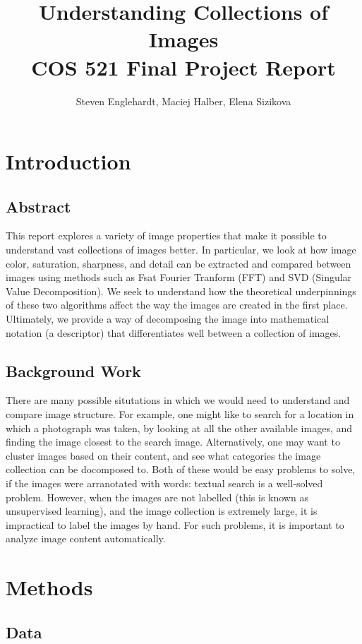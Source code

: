 \documentclass{report}
\author{Steven Englehardt, Maciej Halber, Elena Sizikova}
\title{Understanding Collections of Images \\ \small{COS 521 Final Project Report}}
\begin{document}
\maketitle
\tableofcontents

\chapter{Introduction}
\section{Abstract}
This report explores a variety of image properties that make it possible to understand vast collections of images better. In particular, we look at how image color, saturation, sharpness, and detail can be extracted and compared between images using methods such as Fsat Fourier Tranform (FFT) and SVD (Singular Value Decomposition). We seek to understand how the theoretical underpinnings of these two algorithms affect the way the images are created in the first place. Ultimately, we provide a way of decomposing the image into mathematical notation (a descriptor) that differentiates well between a collection of images.

\section{Background Work}
There are many possible situtations in which we would need to understand and compare image structure. For example, one might like to search for a location in which a photograph was taken, by looking at all the other available images, and finding the image closest to the search image. Alternatively, one may want to cluster images based on their content, and see what categories the image collection can be docomposed to. Both of these would be easy problems to solve, if the images were arranotated with words: textual search is a well-solved problem. However, when the images are not labelled (this is known as unsupervised learning), and the image collection is extremely large, it is impractical to label the images by hand. For such problems, it is important to analyze image content automatically.


\chapter{Methods}
\section{Data}
\end{document}
